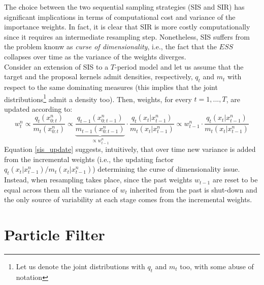 \documentclass[
]{book}
\theoremstyle{break}
\theoremstyle{nonumberplain}
\begin{document}
The choice between the two sequential sampling strategies (SIS and SIR)
has significant implications in terms of computational cost and variance
of the importance weights. In fact, it is clear that SIR is more costly
computationally since it requires an intermediate resampling step.
Nonetheless, SIS suffers from the problem knonw as
\textit{curse of dimensionality}, i.e., the fact that the \(ESS\)
collapses over time as the variance of the weights diverges.\\
Consider an extension of SIS to a \(T\)-period model and let us assume
that the target and the proposal kernels admit densities, respectively,
\(q_t\) and \(m_t\) with respect to the same dominating measures (this
implies that the joint
distributions\footnote{Let us denote the joint distributions with $q_t$ and $m_t$ too, with some abuse of notation}
admit a density too). Then, weights, for every \(t=1,...,T\), are
updated according to: \begin{equation}
    w_t^n\propto \frac{q_t(x_{0:t}^n)}{m_t(x_{0:t}^n)}\propto \underbrace{\frac{q_{t-1}( x_{0:t-1}^n)}{m_{t-1}(x_{0:t-1}^n)}}_{\propto w_{t-1}^n}\cdot \frac{q_t( x_t|x_{t-1}^n)}{m_t(x_t|x_{t-1}^n)}\propto 
    w_{t-1}^n\cdot\frac{q_t( x_t|x_{t-1}^n)}{m_t(x_t|x_{t-1}^n)}\label{sis_update}
\end{equation} Equation \eqref{sis_update} suggests, intuitively, that
over time new variance is added from the incremental weights (i.e., the
updating factor \(q_t( x_t|x_{t-1}^n)/m_t( x_t|x_{t-1}^n)\)) determining
the curse of dimensionality issue. Instead, when resampling takes place,
since the past weights \(w_{t-1}\) are reset to be equal across them all
the variance of \(w_t\) inherited from the past is shut-down and the
only source of variability at each stage comes from the incremental
weights.

\section{Particle Filter}\label{pf_main}

\color{red}
\end{document}
